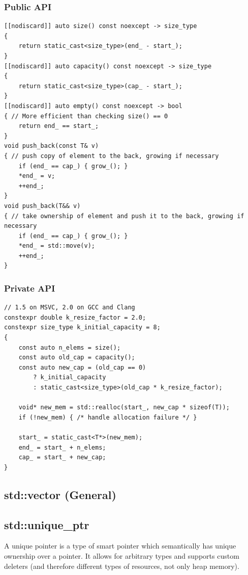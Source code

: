 \documentclass{article}
\begin{document}
\subsubsection{Public API}
\begin{lstlisting}
[[nodiscard]] auto size() const noexcept -> size_type
{
    return static_cast<size_type>(end_ - start_);
}
[[nodiscard]] auto capacity() const noexcept -> size_type
{
    return static_cast<size_type>(cap_ - start_);
}
[[nodiscard]] auto empty() const noexcept -> bool
{ // More efficient than checking size() == 0
    return end_ == start_;
}
void push_back(const T& v)
{ // push copy of element to the back, growing if necessary
    if (end_ == cap_) { grow_(); }
    *end_ = v;
    ++end_;
}
void push_back(T&& v)
{ // take ownership of element and push it to the back, growing if necessary
    if (end_ == cap_) { grow_(); }
    *end_ = std::move(v);
    ++end_;
}
\end{lstlisting}

\subsubsection{Private API}
\begin{lstlisting}
// 1.5 on MSVC, 2.0 on GCC and Clang
constexpr double k_resize_factor = 2.0;
constexpr size_type k_initial_capacity = 8;
{
    const auto n_elems = size();
    const auto old_cap = capacity();
    const auto new_cap = (old_cap == 0)
        ? k_initial_capacity
        : static_cast<size_type>(old_cap * k_resize_factor);

    void* new_mem = std::realloc(start_, new_cap * sizeof(T));
    if (!new_mem) { /* handle allocation failure */ }

    start_ = static_cast<T*>(new_mem);
    end_ = start_ + n_elems;
    cap_ = start_ + new_cap;
}
\end{lstlisting}

\subsection{std::vector (General)}

\subsection{std::unique\_ptr}
A unique pointer is a type of smart pointer which semantically has unique ownership over a pointer. It allows for arbitrary types and supports custom deleters (and therefore different types of resources, not only heap memory).
\end{document}
